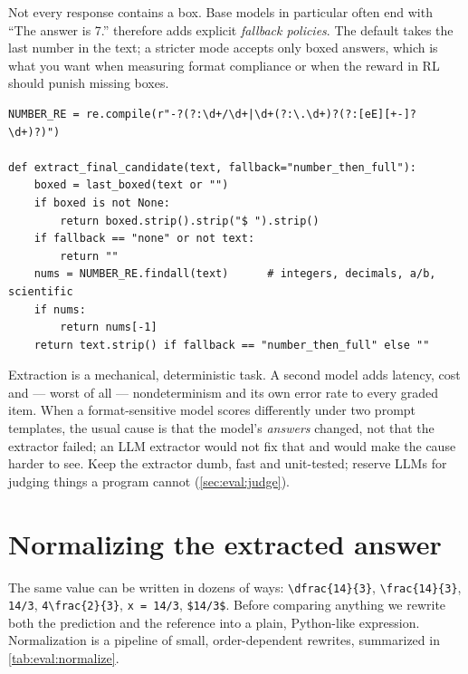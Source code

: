Not every response contains a box. Base models in particular often end with ``The answer is 7.''
 therefore adds explicit \emph{fallback policies}. The default takes the
last number in the text; a stricter mode accepts only boxed answers, which is what you want when
measuring format compliance or when the reward in RL should punish missing boxes.

\begin{lstlisting}[caption={Choosing the candidate string, with explicit fallback policies.},label={lst:eval:candidate}]
NUMBER_RE = re.compile(r"-?(?:\d+/\d+|\d+(?:\.\d+)?(?:[eE][+-]?\d+)?)")

def extract_final_candidate(text, fallback="number_then_full"):
    boxed = last_boxed(text or "")
    if boxed is not None:
        return boxed.strip().strip("$ ").strip()
    if fallback == "none" or not text:
        return ""
    nums = NUMBER_RE.findall(text)      # integers, decimals, a/b, scientific
    if nums:
        return nums[-1]
    return text.strip() if fallback == "number_then_full" else ""
\end{lstlisting}

\begin{keyidea}
Extraction is a mechanical, deterministic task. A second model adds latency, cost and --- worst
of all --- nondeterminism and its own error rate to every graded item. When a format-sensitive
model scores differently under two prompt templates, the usual cause is that the model's
\emph{answers} changed, not that the extractor failed; an LLM extractor would not fix that and
would make the cause harder to see. Keep the extractor dumb, fast and unit-tested; reserve LLMs
for judging things a program cannot (\cref{sec:eval:judge}).
\end{keyidea}

\section{Normalizing the extracted answer}\label{sec:eval:normalize}


The same value can be written in dozens of ways: \texttt{\textbackslash dfrac\{14\}\{3\}},
\texttt{\textbackslash frac\{14\}\{3\}}, \texttt{14/3}, \texttt{4\textbackslash frac\{2\}\{3\}},
\texttt{x = 14/3}, \texttt{\$14/3\$}. Before comparing anything we rewrite both the prediction and
the reference into a plain, Python-like expression. Normalization is a pipeline of small,
order-dependent rewrites, summarized in \cref{tab:eval:normalize}.

